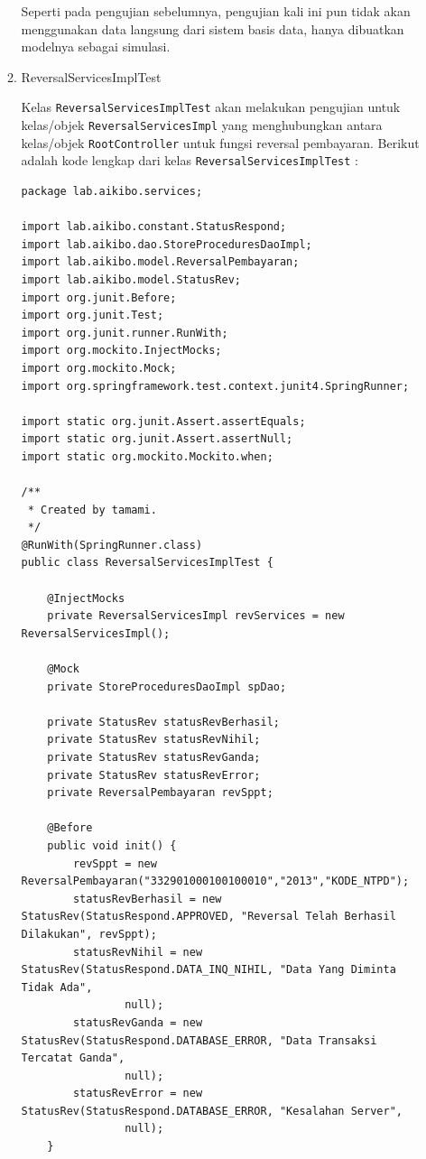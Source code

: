 \documentclass[pdftex,12pt, oneside]{article}
\begin{document}
\begin{enumerate}[A.]
\begin{enumerate}[1.]
    Seperti pada pengujian sebelumnya, pengujian kali ini pun tidak akan menggunakan data langsung dari sistem basis data, hanya dibuatkan modelnya sebagai simulasi.
    
    \item ReversalServicesImplTest
    
    Kelas \texttt{ReversalServicesImplTest} akan melakukan pengujian untuk kelas/objek \texttt{ReversalServicesImpl} yang menghubungkan antara kelas/objek \texttt{RootController} untuk fungsi reversal pembayaran. Berikut adalah kode lengkap dari kelas \texttt{ReversalServicesImplTest} :
    
    \begin{lstlisting}
package lab.aikibo.services;

import lab.aikibo.constant.StatusRespond;
import lab.aikibo.dao.StoreProceduresDaoImpl;
import lab.aikibo.model.ReversalPembayaran;
import lab.aikibo.model.StatusRev;
import org.junit.Before;
import org.junit.Test;
import org.junit.runner.RunWith;
import org.mockito.InjectMocks;
import org.mockito.Mock;
import org.springframework.test.context.junit4.SpringRunner;

import static org.junit.Assert.assertEquals;
import static org.junit.Assert.assertNull;
import static org.mockito.Mockito.when;

/**
 * Created by tamami.
 */
@RunWith(SpringRunner.class)
public class ReversalServicesImplTest {

    @InjectMocks
    private ReversalServicesImpl revServices = new ReversalServicesImpl();

    @Mock
    private StoreProceduresDaoImpl spDao;

    private StatusRev statusRevBerhasil;
    private StatusRev statusRevNihil;
    private StatusRev statusRevGanda;
    private StatusRev statusRevError;
    private ReversalPembayaran revSppt;

    @Before
    public void init() {
        revSppt = new ReversalPembayaran("332901000100100010","2013","KODE_NTPD");
        statusRevBerhasil = new StatusRev(StatusRespond.APPROVED, "Reversal Telah Berhasil Dilakukan", revSppt);
        statusRevNihil = new StatusRev(StatusRespond.DATA_INQ_NIHIL, "Data Yang Diminta Tidak Ada",
                null);
        statusRevGanda = new StatusRev(StatusRespond.DATABASE_ERROR, "Data Transaksi Tercatat Ganda",
                null);
        statusRevError = new StatusRev(StatusRespond.DATABASE_ERROR, "Kesalahan Server",
                null);
    }


\end{lstlisting}
\end{enumerate}
\end{enumerate}
\end{document}
